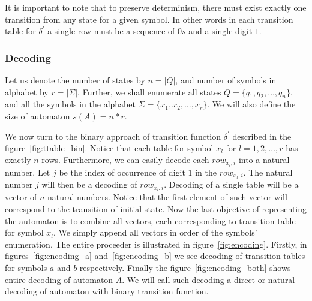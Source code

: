 \documentclass{article}
\begin{document}
It is important to note that to preserve determinism, there must exist exactly one transition from any state for a given symbol. In other words in each transition table for $\delta^{'}$ a single row must be a sequence of $0s$ and a single digit $1$.

\subsubsection{Decoding} \label{sec:auto_dec}

Let us denote the number of states by $n = |Q|$, and number of symbols in alphabet by $r = |\Sigma|$. Further, we shall enumerate all states 	$Q = \{q_1, q_2, \ldots, q_n\}$, and all the symbols in the alphabet 	$\Sigma = \{x_1, x_2, \ldots, x_r\}$. We will also define the size of automaton $s(A) = n*r$.

We now turn to the binary approach of transition function $\delta^{'}$ described in the figure~\ref{fig:ttable_bin}. Notice that each table for symbol $x_l$ for $l = 1,2, \dots, r$ has exactly $n$ rows. Furthermore, we can easily decode each $row_{x_l, i}$ into a natural number. Let $j$ be the index of occurrence of digit $1$ in the $row_{x_l, i}$. The natural number $j$ will then be a decoding of $row_{x_l, i}$. Decoding of a single table will be a vector of $n$ natural numbers. Notice that the first element of such vector will correspond to the transition of initial state. Now the last objective of representing the automaton is to combine all vectors, each corresponding to transition table for symbol $x_{l}$. We simply append all vectors in order of the symbols' enumeration. The entire proceeder is illustrated in figure~\ref{fig:encoding}. Firstly, in figures~\ref{fig:encoding_a} and~\ref{fig:encoding_b} we see decoding of transition tables for symbols $a$ and $b$ respectively. Finally the figure~\ref{fig:encoding_both} shows entire decoding of automaton $A$. We will call such decoding a direct or natural decoding of automaton with binary transition function.
\end{document}
